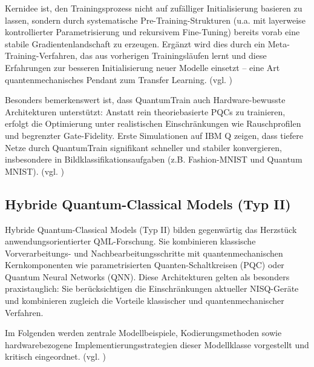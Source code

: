 Kernidee ist, den Trainingsprozess nicht auf zufälliger Initialisierung basieren zu lassen, sondern durch systematische Pre-Training-Strukturen (u.a. mit layerweise kontrollierter Parametrisierung und rekursivem Fine-Tuning) bereits vorab eine stabile Gradientenlandschaft zu erzeugen. Ergänzt wird dies durch ein Meta-Training-Verfahren, das aus vorherigen Trainingsläufen lernt und diese Erfahrungen zur besseren Initialisierung neuer Modelle einsetzt – eine Art quantenmechanisches Pendant zum Transfer Learning. (vgl.  \cite{liuQuantumTrainRethinkingHybrid2024})

Besonders bemerkenswert ist, dass QuantumTrain auch Hardware-bewusste Architekturen unterstützt: Anstatt rein theoriebasierte PQCs zu trainieren, erfolgt die Optimierung unter realistischen Einschränkungen wie Rauschprofilen und begrenzter Gate-Fidelity. Erste Simulationen auf IBM Q zeigen, dass tiefere Netze durch QuantumTrain signifikant schneller und stabiler konvergieren, insbesondere in Bildklassifikationsaufgaben (z.B. Fashion-MNIST und Quantum MNIST). (vgl. \cite{liuQuantumTrainRethinkingHybrid2024})


\vspace{1.5em}
\subsection{Hybride Quantum-Classical Models (Typ II)}


Hybride Quantum-Classical Models (Typ II) bilden gegenwärtig das Herzstück anwendungsorientierter QML-Forschung. Sie kombinieren klassische Vorverarbeitungs- und Nachbearbeitungsschritte mit quantenmechanischen Kernkomponenten wie parametrisierten Quanten-Schaltkreisen (PQC) oder Quantum Neural Networks (QNN). Diese Architekturen gelten als besonders praxistauglich: Sie berücksichtigen die Einschränkungen aktueller NISQ-Geräte und kombinieren zugleich die Vorteile klassischer und quantenmechanischer Verfahren.

Im Folgenden werden zentrale Modellbeispiele, Kodierungsmethoden sowie hardwarebezogene Implementierungsstrategien dieser Modellklasse vorgestellt und kritisch eingeordnet. (vgl. \cite{peral-garciaSystematicLiteratureReview2024})


